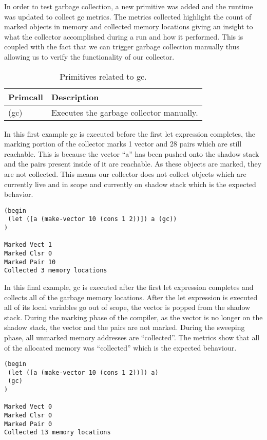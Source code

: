 \documentclass{article}
\begin{document}
In order to test garbage collection, a new primitive was added and the runtime was updated to collect gc metrics. The metrics collected highlight the count of marked objects in memory and collected memory locations giving an insight to what the collector accomplished during a run and how it performed. This is coupled with the fact that we can trigger garbage collection manually thus allowing us to verify the functionality of our collector.

\begin{table}[ht]
  \centering
\begin{tabular}{ l l }
  \toprule
  Primcall & Description \\ \hline
  \midrule
  (gc) & Executes the garbage collector manually. \\
  \bottomrule
\end{tabular}
\caption{Primitives related to gc.} \label{tab:gc}
\end{table}

In this first example gc is executed before the first let expression completes, the marking portion of the collector marks 1 vector and 28 pairs which are still reachable. This is because the vector ``a'' has been pushed onto the shadow stack and the pairs present inside of it are reachable. As these objects are marked, they are not collected. This means our collector does not collect objects which are currently live and in scope and currently on shadow stack which is the expected behavior.

\begin{verbatim}
(begin 
 (let ([a (make-vector 10 (cons 1 2))]) a (gc))
)

Marked Vect 1
Marked Clsr 0
Marked Pair 10
Collected 3 memory locations
\end{verbatim}

In this final example, gc is executed after the first let expression completes and collects all of the garbage memory locations. After the let expression is executed all of its local variables go out of scope, the vector is popped from the shadow stack. During the marking phase of the compiler, as the vector is no longer on the shadow stack, the vector and the pairs are not marked. During the sweeping phase, all unmarked memory addresses are ``collected''. The metrics show that all of the allocated memory was ``collected'' which is the expected behaviour.

\begin{verbatim}
(begin 
 (let ([a (make-vector 10 (cons 1 2))]) a)
 (gc)
)

Marked Vect 0
Marked Clsr 0
Marked Pair 0
Collected 13 memory locations
\end{verbatim}
\end{document}
